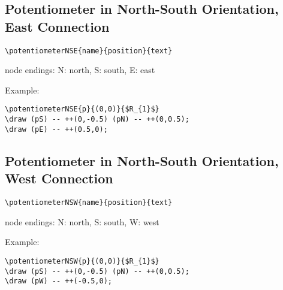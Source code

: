 \documentclass[parskip=full]{scrartcl}
\begin{document}
\subsection{Potentiometer in North-South Orientation, East Connection}

\begin{verbatim}
\potentiometerNSE{name}{position}{text}
\end{verbatim}
node endings: N: north, S: south, E: east

Example:\\
\begin{minipage}{0.8\textwidth}
\begin{verbatim}
\potentiometerNSE{p}{(0,0)}{$R_{1}$}
\draw (pS) -- ++(0,-0.5) (pN) -- ++(0,0.5);
\draw (pE) -- ++(0.5,0);
\end{verbatim}
\end{minipage}
\begin{minipage}{0.19\textwidth}
\end{minipage}

\subsection{Potentiometer in North-South Orientation, West Connection}

\begin{verbatim}
\potentiometerNSW{name}{position}{text}
\end{verbatim}
node endings: N: north, S: south, W: west

Example:\\
\begin{minipage}{0.8\textwidth}
\begin{verbatim}
\potentiometerNSW{p}{(0,0)}{$R_{1}$}
\draw (pS) -- ++(0,-0.5) (pN) -- ++(0,0.5);
\draw (pW) -- ++(-0.5,0);
\end{verbatim}
\end{minipage}
\begin{minipage}{0.19\textwidth}
\end{minipage}
\end{document}

